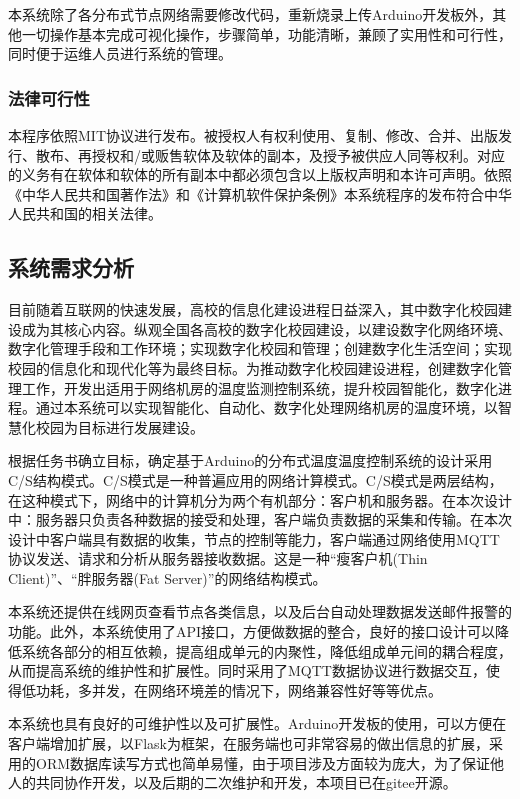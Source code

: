 本系统除了各分布式节点网络需要修改代码，重新烧录上传Arduino开发板外，其他一切操作基本完成可视化操作，步骤简单，功能清晰，兼顾了实用性和可行性，同时便于运维人员进行系统的管理。

\subsubsection{法律可行性}

本程序依照MIT协议进行发布。被授权人有权利使用、复制、修改、合并、出版发行、散布、再授权和/或贩售软体及软体的副本，及授予被供应人同等权利。对应的义务有在软体和软体的所有副本中都必须包含以上版权声明和本许可声明。依照《中华人民共和国著作法》和《计算机软件保护条例》本系统程序的发布符合中华人民共和国的相关法律。

\subsection{系统需求分析}

目前随着互联网的快速发展，高校的信息化建设进程日益深入，其中数字化校园建设成为其核心内容。纵观全国各高校的数字化校园建设，以建设数字化网络环境、数字化管理手段和工作环境；实现数字化校园和管理；创建数字化生活空间；实现校园的信息化和现代化等为最终目标。为推动数字化校园建设进程，创建数字化管理工作，开发出适用于网络机房的温度监测控制系统，提升校园智能化，数字化进程。通过本系统可以实现智能化、自动化、数字化处理网络机房的温度环境，以智慧化校园为目标进行发展建设。

根据任务书确立目标，确定基于Arduino的分布式温度温度控制系统的设计采用C/S结构模式。C/S模式是一种普遍应用的网络计算模式。C/S模式是两层结构，在这种模式下，网络中的计算机分为两个有机部分：客户机和服务器。在本次设计中：服务器只负责各种数据的接受和处理，客户端负责数据的采集和传输。在本次设计中客户端具有数据的收集，节点的控制等能力，客户端通过网络使用MQTT协议发送、请求和分析从服务器接收数据。这是一种“瘦客户机(Thin Client)”、“胖服务器(Fat Server)”的网络结构模式。

本系统还提供在线网页查看节点各类信息，以及后台自动处理数据发送邮件报警的功能。此外，本系统使用了API接口，方便做数据的整合，良好的接口设计可以降低系统各部分的相互依赖，提高组成单元的内聚性，降低组成单元间的耦合程度，从而提高系统的维护性和扩展性。同时采用了MQTT数据协议进行数据交互，使得低功耗，多并发，在网络环境差的情况下，网络兼容性好等等优点。

本系统也具有良好的可维护性以及可扩展性。Arduino开发板的使用，可以方便在客户端增加扩展，以Flask为框架，在服务端也可非常容易的做出信息的扩展，采用的ORM数据库读写方式也简单易懂，由于项目涉及方面较为庞大，为了保证他人的共同协作开发，以及后期的二次维护和开发，本项目已在gitee开源。

